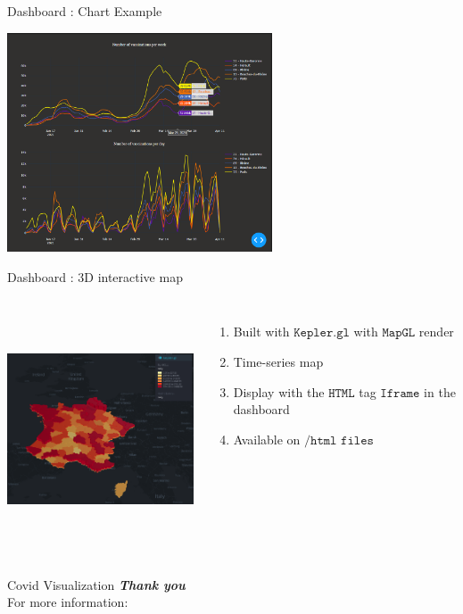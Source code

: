 \documentclass[11pt, compress, tikz, xcolor=table]{beamer}
\theoremstyle{definition}
\begin{document}
\begin{frame}[fragile]{Dashboard : Chart Example} 

\centering
\includegraphics[width=\textwidth, height=6.5cm]{images/charts_dashboard.png}
\\

\end{frame}

\begin{frame}[fragile]{Dashboard : 3D interactive map} 

\begin{columns}
             \centering
             \includegraphics[height=7cm, width=7cm]{images/vacc_daily_map3D_kepler.png}
              \textbf{} \begin{enumerate}
                  \item Built with $\texttt{Kepler.gl}$ with $\texttt{MapGL}$ render
                  \item Time-series map
                  \item Display with the $\texttt{HTML}$ tag $\texttt{Iframe}$ in the dashboard
                  \item Available on $\texttt{/html files}$
              \end{enumerate}
         \end{columns} 

\end{frame}



\begin{frame}{Covid Visualization}
\centering
\textit{\textbf{Thank you}}\\
  For more information:  \href{https://github.com/jihene-b3/covidviz}{}
\end{frame}
\end{document}
